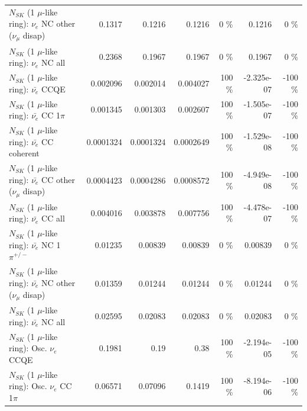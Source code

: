 \begin{table}
\begin{tabular}{| l | r | r | r  r | r  r |}
                $N_{SK}$ (1 $\mu$-like ring): $\nu_e$ NC other ($\nu_\mu$ disap) &          0.1317 &          0.1216 &          0.1216 &        0 \%  &          0.1216 &        0 \%  \\ 
                                  $N_{SK}$ (1 $\mu$-like ring): $\nu_{e}$ NC all &          0.2368 &          0.1967 &          0.1967 &        0 \%  &          0.1967 &        0 \%  \\ 
\hline
\hline
\hline
                                $N_{SK}$ (1 $\mu$-like ring): $\bar{\nu_e}$ CCQE &        0.002096 &        0.002014 &        0.004027 &      100 \%  &      -2.325e-07 &     -100 \%  \\ 
                           $N_{SK}$ (1 $\mu$-like ring): $\bar{\nu_e}$ CC 1$\pi$ &        0.001345 &        0.001303 &        0.002607 &      100 \%  &      -1.505e-07 &     -100 \%  \\ 
                         $N_{SK}$ (1 $\mu$-like ring): $\bar{\nu_e}$ CC coherent &       0.0001324 &       0.0001324 &       0.0002649 &      100 \%  &      -1.529e-08 &     -100 \%  \\ 
          $N_{SK}$ (1 $\mu$-like ring): $\bar{\nu_e}$ CC other ($\nu_\mu$ disap) &       0.0004423 &       0.0004286 &       0.0008572 &      100 \%  &      -4.949e-08 &     -100 \%  \\ 
                            $N_{SK}$ (1 $\mu$-like ring): $\bar{\nu_{e}}$ CC all &        0.004016 &        0.003878 &        0.007756 &      100 \%  &      -4.478e-07 &     -100 \%  \\ 
\hline
                     $N_{SK}$ (1 $\mu$-like ring): $\bar{\nu_e}$ NC 1$\pi^{+/-}$ &         0.01235 &         0.00839 &         0.00839 &        0 \%  &         0.00839 &        0 \%  \\ 
          $N_{SK}$ (1 $\mu$-like ring): $\bar{\nu_e}$ NC other ($\nu_\mu$ disap) &         0.01359 &         0.01244 &         0.01244 &        0 \%  &         0.01244 &        0 \%  \\ 
                            $N_{SK}$ (1 $\mu$-like ring): $\bar{\nu_{e}}$ NC all &         0.02595 &         0.02083 &         0.02083 &        0 \%  &         0.02083 &        0 \%  \\ 
\hline
\hline
\hline
                                 $N_{SK}$ (1 $\mu$-like ring): Osc. $\nu_e$ CCQE &          0.1981 &            0.19 &            0.38 &      100 \%  &      -2.194e-05 &     -100 \%  \\ 
                            $N_{SK}$ (1 $\mu$-like ring): Osc. $\nu_e$ CC 1$\pi$ &         0.06571 &         0.07096 &          0.1419 &      100 \%  &      -8.194e-06 &     -100 \%  \\ 

\end{tabular}
\end{table}
